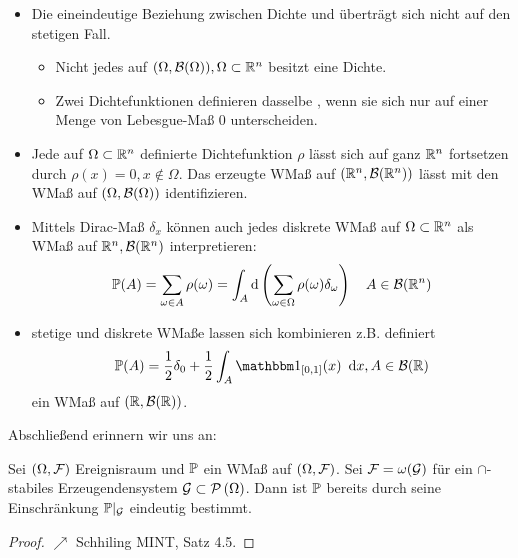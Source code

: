 \begin{*bemerkung}
    \begin{itemize}[leftmargin=*, nolistsep]
        \item Die eineindeutige Beziehung zwischen Dichte und \WMass überträgt sich nicht auf den stetigen Fall.
        \begin{itemize}[nolistsep]
            \item Nicht jedes \WMass auf $(\Omega, \borel{\Omega}), \Omega \subset \Rn$ besitzt eine Dichte.
            \item Zwei Dichtefunktionen definieren dasselbe \WMass, wenn sie sich nur auf einer Menge von Lebesgue-Maß $0$ unterscheiden.
        \end{itemize}
        \item Jede auf $\Omega \subset \Rn$ definierte Dichtefunktion $\rho$ lässt sich auf ganz $\Rn$ fortsetzen durch $\rho(x) = 0, x \notin \Omega$. Das erzeugte WMaß auf $(\Rn, \borel{\Rn})$ lässt mit den WMaß auf $(\Omega, \borel{\Omega})$ identifizieren.
        \item Mittels Dirac-Maß $\delta_{x}$ können auch jedes diskrete WMaß auf $\Omega \subset \Rn$ als WMaß auf $\Rn, \borel{\Rn}$ interpretieren:
        \begin{equation*}
            \P(A) = \sum_{\omega \in A} \rho(\omega) = \int_{A} \mathrm{d} \left( \sum_{\omega \in \Omega} \rho(\omega)\delta_{\omega} \right) \quad A \in \borel{\Rn}
        \end{equation*}
        \item stetige und diskrete WMaße lassen sich kombinieren z.B. definiert
        \begin{equation*}
            \P(A) = \frac{1}{2} \delta_{0} + \frac{1}{2} \int_{A} \one_{[0,1]}(x) \dx, A \in \borel{\R}
        \end{equation*}
        ein WMaß auf $(\R, \borel{\R})$.
    \end{itemize}
\end{*bemerkung}

Abschließend erinnern wir uns an:

\begin{satz} \label{satz: 1.9_eindeutigkeitssatz}
    Sei $(\Omega, \ereignisF)$ Ereignisraum und $\P$ ein WMaß auf $(\Omega, \ereignisF)$. 
    Sei $\ereignisF = \omega(\mathcal{G})$ für ein $\cap$-stabiles Erzeugendensystem $\mathcal{G} \subset \pows{\Omega}$. 
    Dann ist $\P$ bereits durch seine Einschränkung $\P |_{\mathcal{G}}$ eindeutig bestimmt.
\end{satz}
\begin{proof}
    $\nearrow$ Schhiling MINT, Satz 4.5.
\end{proof}

